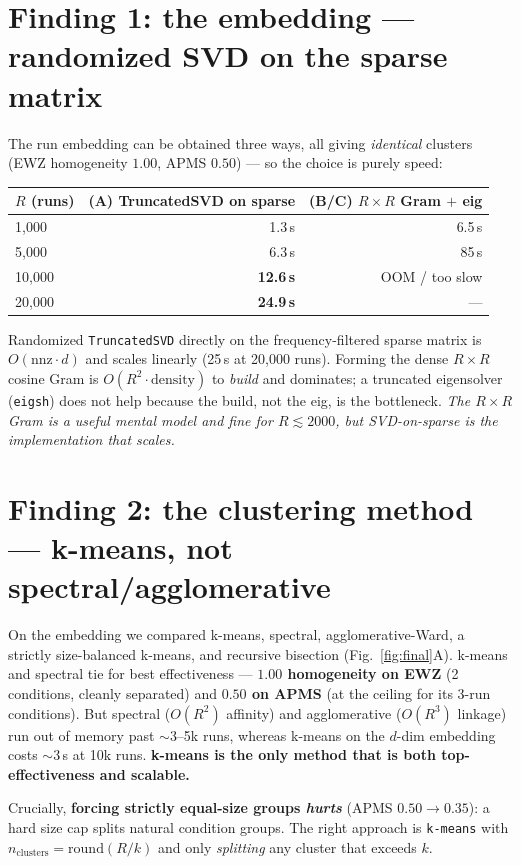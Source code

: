 \documentclass[11pt]{article}
\newcommand{\code}[1]{\texttt{\small #1}}
\begin{document}
\section{Finding 1: the embedding --- randomized SVD on the sparse matrix}
The run embedding can be obtained three ways, all giving \emph{identical} clusters (EWZ homogeneity
$1.00$, APMS $0.50$) --- so the choice is purely speed:

\begin{center}\small
\begin{tabular}{lrr}
\toprule
$R$ (runs) & (A) TruncatedSVD on sparse & (B/C) $R\times R$ Gram $+$ eig \\
\midrule
1{,}000  & 1.3\,s  & 6.5\,s \\
5{,}000  & 6.3\,s  & 85\,s \\
10{,}000 & \textbf{12.6\,s} & OOM / too slow \\
20{,}000 & \textbf{24.9\,s} & --- \\
\bottomrule
\end{tabular}
\end{center}

Randomized \code{TruncatedSVD} directly on the frequency-filtered sparse matrix is $O(\text{nnz}\cdot
d)$ and scales linearly (25\,s at 20{,}000 runs). Forming the dense $R\times R$ cosine Gram is
$O(R^2\cdot\text{density})$ to \emph{build} and dominates; a truncated eigensolver (\code{eigsh})
does not help because the build, not the eig, is the bottleneck. \emph{The $R\times R$ Gram is a
useful mental model and fine for $R\lesssim2000$, but SVD-on-sparse is the implementation that
scales.}

\section{Finding 2: the clustering method --- k-means, not spectral/agglomerative}
On the embedding we compared k-means, spectral, agglomerative-Ward, a strictly size-balanced
k-means, and recursive bisection (Fig.~\ref{fig:final}A). k-means and spectral tie for best
effectiveness --- \textbf{$1.00$ homogeneity on EWZ} (2 conditions, cleanly separated) and
\textbf{$0.50$ on APMS} (at the ceiling for its 3-run conditions). But spectral ($O(R^2)$ affinity)
and agglomerative ($O(R^3)$ linkage) run out of memory past $\sim$3--5k runs, whereas k-means on the
$d$-dim embedding costs $\sim$3\,s at 10k runs. \textbf{k-means is the only method that is both
top-effectiveness and scalable.}

Crucially, \textbf{forcing strictly equal-size groups \emph{hurts}} (APMS $0.50\!\to\!0.35$): a hard
size cap splits natural condition groups. The right approach is \code{k-means} with
$n_{\text{clusters}}=\text{round}(R/k)$ and only \emph{splitting} any cluster that exceeds $k$.
\end{document}
